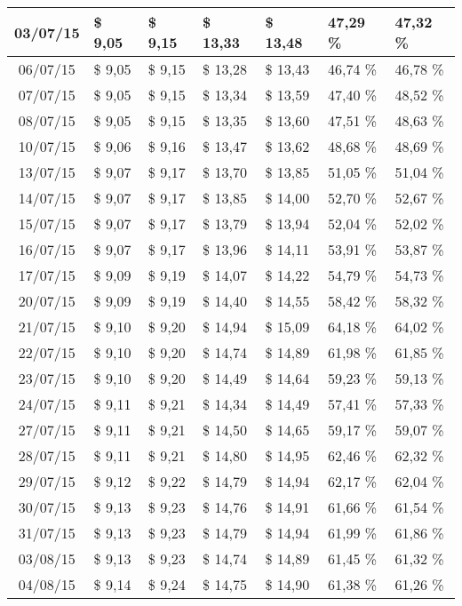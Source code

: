 \begin{center}
\begin{longtable}{|c|p{1.5cm}|p{1.5cm}|p{1.5cm}|p{1.5cm}|p{1.5cm}|p{1.5cm}|}
03/07/15 & \$ 9,05 & \$ 9,15 & \$ 13,33 & \$ 13,48 & 47,29 \% & 47,32 \% \\ \hline
06/07/15 & \$ 9,05 & \$ 9,15 & \$ 13,28 & \$ 13,43 & 46,74 \% & 46,78 \% \\ \hline
07/07/15 & \$ 9,05 & \$ 9,15 & \$ 13,34 & \$ 13,59 & 47,40 \% & 48,52 \% \\ \hline
08/07/15 & \$ 9,05 & \$ 9,15 & \$ 13,35 & \$ 13,60 & 47,51 \% & 48,63 \% \\ \hline
10/07/15 & \$ 9,06 & \$ 9,16 & \$ 13,47 & \$ 13,62 & 48,68 \% & 48,69 \% \\ \hline
13/07/15 & \$ 9,07 & \$ 9,17 & \$ 13,70 & \$ 13,85 & 51,05 \% & 51,04 \% \\ \hline
14/07/15 & \$ 9,07 & \$ 9,17 & \$ 13,85 & \$ 14,00 & 52,70 \% & 52,67 \% \\ \hline
15/07/15 & \$ 9,07 & \$ 9,17 & \$ 13,79 & \$ 13,94 & 52,04 \% & 52,02 \% \\ \hline
16/07/15 & \$ 9,07 & \$ 9,17 & \$ 13,96 & \$ 14,11 & 53,91 \% & 53,87 \% \\ \hline
17/07/15 & \$ 9,09 & \$ 9,19 & \$ 14,07 & \$ 14,22 & 54,79 \% & 54,73 \% \\ \hline
20/07/15 & \$ 9,09 & \$ 9,19 & \$ 14,40 & \$ 14,55 & 58,42 \% & 58,32 \% \\ \hline
21/07/15 & \$ 9,10 & \$ 9,20 & \$ 14,94 & \$ 15,09 & 64,18 \% & 64,02 \% \\ \hline
22/07/15 & \$ 9,10 & \$ 9,20 & \$ 14,74 & \$ 14,89 & 61,98 \% & 61,85 \% \\ \hline
23/07/15 & \$ 9,10 & \$ 9,20 & \$ 14,49 & \$ 14,64 & 59,23 \% & 59,13 \% \\ \hline
24/07/15 & \$ 9,11 & \$ 9,21 & \$ 14,34 & \$ 14,49 & 57,41 \% & 57,33 \% \\ \hline
27/07/15 & \$ 9,11 & \$ 9,21 & \$ 14,50 & \$ 14,65 & 59,17 \% & 59,07 \% \\ \hline
28/07/15 & \$ 9,11 & \$ 9,21 & \$ 14,80 & \$ 14,95 & 62,46 \% & 62,32 \% \\ \hline
29/07/15 & \$ 9,12 & \$ 9,22 & \$ 14,79 & \$ 14,94 & 62,17 \% & 62,04 \% \\ \hline
30/07/15 & \$ 9,13 & \$ 9,23 & \$ 14,76 & \$ 14,91 & 61,66 \% & 61,54 \% \\ \hline
31/07/15 & \$ 9,13 & \$ 9,23 & \$ 14,79 & \$ 14,94 & 61,99 \% & 61,86 \% \\ \hline
03/08/15 & \$ 9,13 & \$ 9,23 & \$ 14,74 & \$ 14,89 & 61,45 \% & 61,32 \% \\ \hline
04/08/15 & \$ 9,14 & \$ 9,24 & \$ 14,75 & \$ 14,90 & 61,38 \% & 61,26 \% \\ \hline

\end{longtable}
\end{center}
